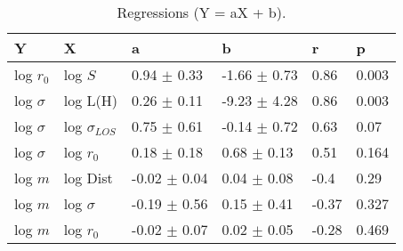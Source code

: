 \begin{table}
\centering
\caption{Regressions (Y = aX + b).}
\begin{tabular}{llllll}
\toprule
            Y &                   X &                 a &                 b &      r &      p \\
\midrule
    log $r_0$ &             log $S$ &   0.94 $\pm$ 0.33 &  -1.66 $\pm$ 0.73 &   0.86 &  0.003 \\
 log $\sigma$ &            log L(H) &   0.26 $\pm$ 0.11 &  -9.23 $\pm$ 4.28 &   0.86 &  0.003 \\
 log $\sigma$ &  log $\sigma_{LOS}$ &   0.75 $\pm$ 0.61 &  -0.14 $\pm$ 0.72 &   0.63 &   0.07 \\
 log $\sigma$ &         log $r_{0}$ &   0.18 $\pm$ 0.18 &   0.68 $\pm$ 0.13 &   0.51 &  0.164 \\
      log $m$ &            log Dist &  -0.02 $\pm$ 0.04 &   0.04 $\pm$ 0.08 &   -0.4 &   0.29 \\
      log $m$ &        log $\sigma$ &  -0.19 $\pm$ 0.56 &   0.15 $\pm$ 0.41 &  -0.37 &  0.327 \\
      log $m$ &         log $r_{0}$ &  -0.02 $\pm$ 0.07 &   0.02 $\pm$ 0.05 &  -0.28 &  0.469 \\
\bottomrule
\end{tabular}
\end{table}
